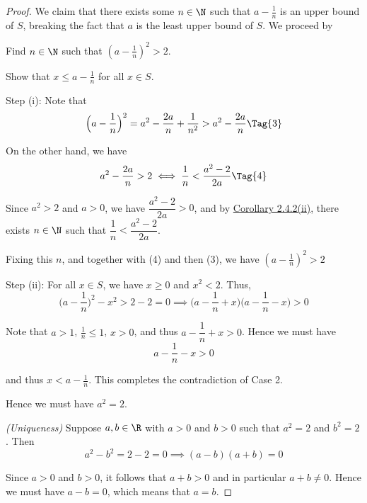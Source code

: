 \begin{proof}
  We claim that there exists some $n\in\N$ such that $a-\frac1n$ is an upper
  bound of $S$, breaking the fact that $a$ is the least upper bound of $S$. We
  proceed by
  \begin{enumerati}
    \item Find $n\in\N$ such that $(a-\frac1n)^2>2$.
    \item Show that $x\leq a-\frac1n$ for all $x\in S$.
  \end{enumerati}

  Step (i): Note that
  \begin{equation*}
    \Big(a-\frac1n\Big)^2=a^2-\frac{2a}n+\frac1{n^2}>a^2-\frac{2a}n\Tag{3}
  \end{equation*}

  On the other hand, we have
  \begin{equation*}
    a^2-\frac{2a}n>2\iff\frac1n<\frac{a^2-2}{2a}\Tag{4}
  \end{equation*}

  Since $a^2>2$ and $a>0$, we have $\dfrac{a^2-2}{2a}>0$, and by
  \href{d845856}{Corollary 2.4.2(ii)}, there exists $n\in\N$ such that
  $\dfrac1n<\dfrac{a^2-2}{2a}$.

  Fixing this $n$, and together with (4) and then (3), we have $(a-\frac1n)^2>2$

  Step (ii): For all $x\in S$, we have $x\geq0$ and $x^2<2$. Thus,
  \begin{equation*}
    \Big(a-\frac1n\Big)^2-x^2>2-2=0\implies\Big(a-\frac1n+x\Big)\Big(a-\frac1n-x\Big)>0
  \end{equation*}

  Note that $a>1$, $\frac1n\leq 1$, $x>0$, and thus $a-\dfrac1n+x>0$. Hence we
  must have
  $$
    a-\frac1n-x>0
  $$

  and thus $x<a-\frac1n$. This completes the contradiction of Case 2.

  Hence we must have $a^2=2$.

  \textit{(Uniqueness)} Suppose $a,b\in\R$ with $a>0$ and $b>0$ such that
  $a^2=2$ and $b^2=2$. Then
  \begin{equation*}
    a^2-b^2=2-2=0\implies(a-b)(a+b)=0
  \end{equation*}

  Since $a>0$ and $b>0$, it follows that $a+b>0$ and in particular $a+b\neq0$.
  Hence we must have $a-b=0$, which means that $a=b$.
\end{proof}

\label{c70a9ac}

